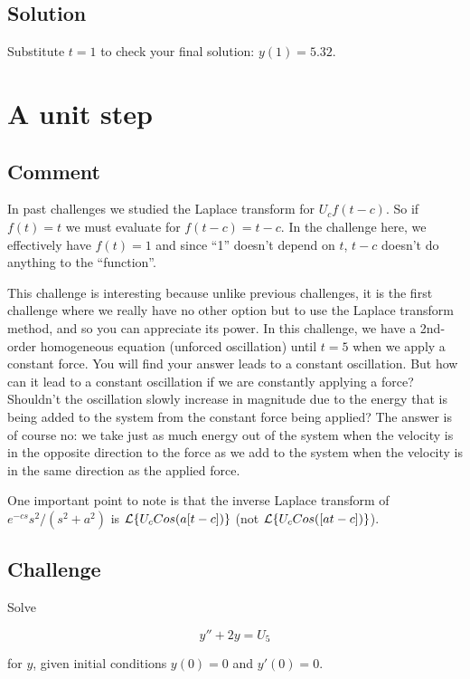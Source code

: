 \subsection*{Solution}
Substitute $t=1$ to check your final solution: $y(1)=5.32$.




\newpage
\section{A unit step}

\subsection*{Comment}
In past challenges we studied the Laplace transform for $U_c f(t-c)$. So if $f(t)=t$ we must evaluate for $f(t-c)=t-c$. In the challenge here, we effectively have $f(t)=1$ and since ``1'' doesn't depend on $t$, $t-c$ doesn't do anything to the ``function''.

This challenge is interesting because unlike previous challenges, it is the first challenge where we really have no other option but to use the Laplace transform method, and so you can appreciate its power. In this challenge, we have a 2nd-order homogeneous equation (unforced oscillation) until $t=5$ when we apply a constant force. You will find your answer leads to a constant oscillation. But how can it lead to a constant oscillation if we are constantly applying a force? Shouldn't the oscillation slowly increase in magnitude due to the energy that is being added to the system from the constant force being applied? The answer is of course no: we take just as much energy out of the system when the velocity is in the opposite direction to the force as we add to the system when the velocity is in the same direction as the applied force.

One important point to note is that the inverse Laplace transform of $e^{-cs} s^2/(s^2+a^2)$ is $\mathcal{L}\{U_c Cos(a[t-c])\}$ (not $\mathcal{L}\{U_c Cos([at-c])\}$).

\subsection*{Challenge}
Solve

\begin{equation}
    y''+2y=U_5
\end{equation}

for $y$, given initial conditions $y(0)=0$ and $y'(0)=0$. 

